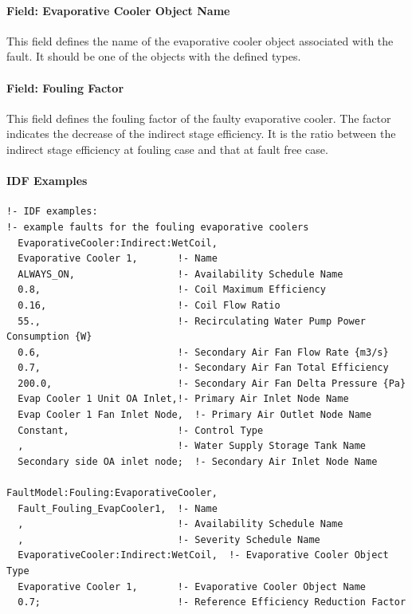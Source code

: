 \paragraph{Field: Evaporative Cooler Object Name}\label{field-evaporative-cooler-object-name}

This field defines the name of the evaporative cooler object associated with the fault. It should be one of the objects with the defined types.

\paragraph{Field: Fouling Factor}\label{field-fouling-factor}

This field defines the fouling factor of the faulty evaporative cooler. The factor indicates the decrease of the indirect stage efficiency. It is the ratio between the indirect stage efficiency at fouling case and that at fault free case.

\paragraph{IDF Examples}

\begin{lstlisting}
!- IDF examples:
!- example faults for the fouling evaporative coolers
  EvaporativeCooler:Indirect:WetCoil,
  Evaporative Cooler 1,       !- Name
  ALWAYS_ON,                  !- Availability Schedule Name
  0.8,                        !- Coil Maximum Efficiency
  0.16,                       !- Coil Flow Ratio
  55.,                        !- Recirculating Water Pump Power Consumption {W}
  0.6,                        !- Secondary Air Fan Flow Rate {m3/s}
  0.7,                        !- Secondary Air Fan Total Efficiency
  200.0,                      !- Secondary Air Fan Delta Pressure {Pa}
  Evap Cooler 1 Unit OA Inlet,!- Primary Air Inlet Node Name
  Evap Cooler 1 Fan Inlet Node,  !- Primary Air Outlet Node Name
  Constant,                   !- Control Type
  ,                           !- Water Supply Storage Tank Name
  Secondary side OA inlet node;  !- Secondary Air Inlet Node Name

FaultModel:Fouling:EvaporativeCooler,
  Fault_Fouling_EvapCooler1,  !- Name
  ,                           !- Availability Schedule Name
  ,                           !- Severity Schedule Name
  EvaporativeCooler:Indirect:WetCoil,  !- Evaporative Cooler Object Type
  Evaporative Cooler 1,       !- Evaporative Cooler Object Name
  0.7;                        !- Reference Efficiency Reduction Factor
\end{lstlisting}


